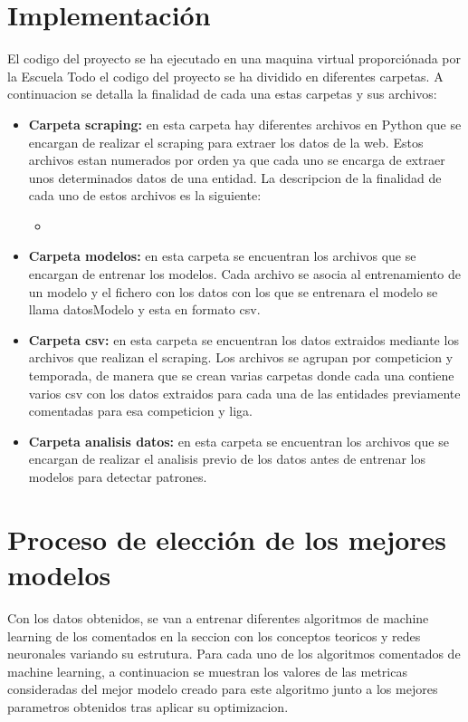 \section{Implementación}
El codigo del proyecto se ha ejecutado en una maquina virtual proporciónada por la Escuela
Todo el codigo del proyecto se ha dividido en diferentes carpetas. A continuacion se detalla la finalidad de cada una estas carpetas y sus archivos:
\begin{itemize}
    \item \textbf{Carpeta scraping:} en esta carpeta hay diferentes archivos en Python que se encargan de realizar el scraping para extraer los datos de la web. Estos archivos estan numerados por orden ya que cada uno se encarga de extraer unos determinados datos de una entidad. La descripcion de la finalidad de cada uno de estos archivos es la siguiente:
    \begin{itemize}
        \item
    \end{itemize}
    \item \textbf{Carpeta modelos:} en esta carpeta se encuentran los archivos que se encargan de entrenar los modelos. Cada archivo se asocia al entrenamiento de un modelo y el fichero con los datos con los que se entrenara el modelo se llama datosModelo y esta en formato csv.
    \item \textbf{Carpeta csv:} en esta carpeta se encuentran los datos extraidos mediante los archivos que realizan el scraping. Los archivos se agrupan por competicion y temporada, de manera que se crean varias carpetas donde cada una contiene varios csv con los datos extraidos para cada una de las entidades previamente comentadas para esa competicion y liga.
    \item \textbf{Carpeta analisis datos:} en esta carpeta se encuentran los archivos que se encargan de realizar el analisis previo de los datos antes de entrenar los modelos para detectar patrones. 
\end{itemize}


\section{Proceso de elección de los mejores modelos}
Con los datos obtenidos, se van a entrenar diferentes algoritmos de machine learning de los comentados en la seccion con los conceptos teoricos y redes neuronales variando su estrutura. Para cada uno de los algoritmos comentados de machine learning, a continuacion se muestran los valores de las metricas consideradas del mejor modelo creado para este algoritmo junto a los mejores parametros obtenidos tras aplicar su optimizacion.



